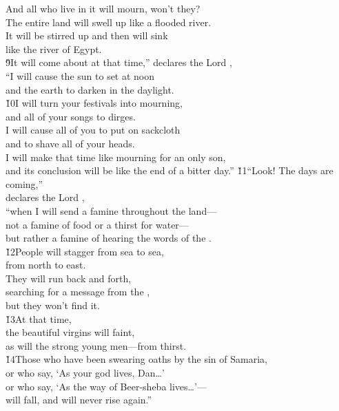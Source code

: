 \begin{poetry}
\poemll    And all who live in it will mourn, won't they? \\
\poeml The entire land will swell up like a flooded river. \\
\poemll    It will be stirred up and then will sink \\
\poemlll       like the river of Egypt. \\
\poeml \v{9}It will come about at that time,'' declares the Lord , \\
\poemll    ``I will cause the sun to set at noon \\
\poemlll       and the earth to darken in the daylight. \\
\poeml \v{10}I will turn your festivals into mourning, \\
\poemll    and all of your songs to dirges. \\
\poeml I will cause all of you to put on sackcloth \\
\poemll    and to shave all of your heads. \\
\poeml I will make that time like mourning for an only son, \\
\poemll    and its conclusion will be like the end of a bitter day.''
\poeml \v{11}``Look! The days are coming,'' \\
\poemll    declares the Lord , \\
\poeml ``when I will send a famine throughout the land--- \\
\poemll    not a famine of food or a thirst for water--- \\
\poemlll       but rather a famine of hearing the words of the . \\
\poeml \v{12}People will stagger from sea to sea, \\
\poemll    from north to east. \\
\poeml They will run back and forth, \\
\poemll    searching for a message from the , \\
\poemlll       but they won't find it. \\
\poeml \v{13}At that time, \\
\poemll    the beautiful virgins will faint, \\
\poemlll       as will the strong young men---from thirst. \\
\poeml \v{14}Those who have been swearing oaths by the sin of Samaria, \\
\poemll    or who say, `As your god lives, Dan{\ldots}' \\
\poeml or who say, `As the way of Beer-sheba lives{\ldots}'--- \\
\poemll    will fall, and will never rise again.''
\end{poetry}

